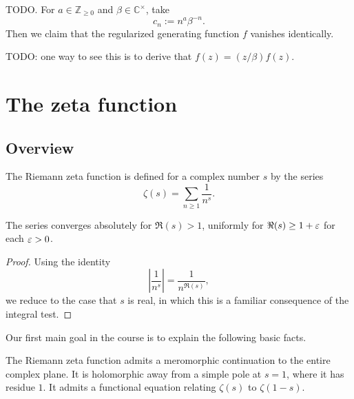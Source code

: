 \documentclass[reqno]{amsart}  \numberwithin{theorem}{section} \numberwithin{equation}{section}
\begin{document}
\begin{example}
  TODO.  For $a \in \mathbb{Z}_{\geq 0}$ and $\beta \in \mathbb{C}^\times$, take
  \begin{equation*}
c_n := n^a \beta^{- n}.
\end{equation*}
Then we claim that the regularized generating function $f$ vanishes identically.

TODO: one way to see this is to derive that $f(z) = (z / \beta) f(z)$.
\end{example}

\newpage
\section{The zeta function}

\subsection{Overview}
The Riemann zeta function is defined for a complex number $s$ by the series
\begin{equation*}
\zeta (s) = \sum_{n \geq 1} \frac{1}{n^s }.
\end{equation*}
\begin{lemma}
The series converges absolutely for $\Re(s) > 1$, uniformly for $\Re(s) \geq 1 + \varepsilon$ for each $\varepsilon > 0$.
\end{lemma}
\begin{proof}
  Using the identity
  \begin{equation*}
    \left\lvert \frac{1}{n^s} \right\rvert = \frac{1}{n^{\Re(s)}},
  \end{equation*}
  we reduce to the case that $s$ is real, in which this is a familiar consequence of the integral test.
\end{proof}

Our first main goal in the course is to explain the following basic facts.
\begin{theorem}
The Riemann zeta function admits a meromorphic continuation to the entire complex plane.  It is holomorphic away from a simple pole at $s = 1$, where it has residue $1$.  It admits a functional equation relating $\zeta (s)$ to $\zeta (1-s)$.
\end{theorem}
\end{document}
